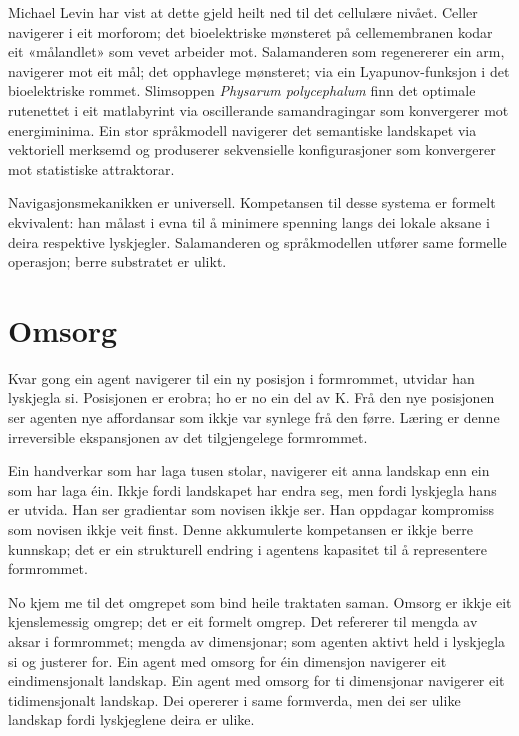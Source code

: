 Michael Levin har vist at dette gjeld heilt ned til det cellulære nivået. Celler navigerer i eit morforom; det bioelektriske mønsteret på cellemembranen kodar eit «målandlet» som vevet arbeider mot. Salamanderen som regenererer ein arm, navigerer mot eit mål; det opphavlege mønsteret; via ein Lyapunov-funksjon i det bioelektriske rommet. Slimsoppen \textit{Physarum polycephalum} finn det optimale rutenettet i eit matlabyrint via oscillerande samandragingar som konvergerer mot energiminima. Ein stor språkmodell navigerer det semantiske landskapet via vektoriell merksemd og produserer sekvensielle konfigurasjoner som konvergerer mot statistiske attraktorar.

Navigasjonsmekanikken er universell. Kompetansen til desse systema er formelt ekvivalent: han målast i evna til å minimere spenning langs dei lokale aksane i deira respektive lyskjegler. Salamanderen og språkmodellen utfører same formelle operasjon; berre substratet er ulikt.

\section*{Omsorg}


Kvar gong ein agent navigerer til ein ny posisjon i formrommet, utvidar han lyskjegla si. Posisjonen er erobra; ho er no ein del av K. Frå den nye posisjonen ser agenten nye affordansar som ikkje var synlege frå den førre. Læring er denne irreversible ekspansjonen av det tilgjengelege formrommet.

Ein handverkar som har laga tusen stolar, navigerer eit anna landskap enn ein som har laga éin. Ikkje fordi landskapet har endra seg, men fordi lyskjegla hans er utvida. Han ser gradientar som novisen ikkje ser. Han oppdagar kompromiss som novisen ikkje veit finst. Denne akkumulerte kompetansen er ikkje berre kunnskap; det er ein strukturell endring i agentens kapasitet til å representere formrommet.


No kjem me til det omgrepet som bind heile traktaten saman. Omsorg er ikkje eit kjenslemessig omgrep; det er eit formelt omgrep. Det refererer til mengda av aksar i formrommet; mengda av dimensjonar; som agenten aktivt held i lyskjegla si og justerer for. Ein agent med omsorg for éin dimensjon navigerer eit eindimensjonalt landskap. Ein agent med omsorg for ti dimensjonar navigerer eit tidimensjonalt landskap. Dei opererer i same formverda, men dei ser ulike landskap fordi lyskjeglene deira er ulike.

